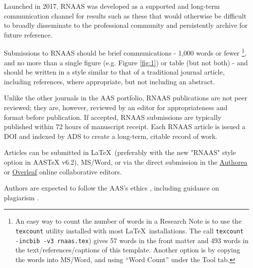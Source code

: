 \documentclass[RNAAS]{aastex62}
\newcommand\latex{La\TeX}
\begin{document}
Launched in 2017, RNAAS was developed as a supported and long-term
communication channel for results such as these that would otherwise be
difficult to broadly disseminate to the professional community and persistently
archive for future reference.

Submissions to RNAAS should be brief communications - 1,000 words or fewer
\footnote{An easy way to count the number of words in a Research Note is to use
the \texttt{texcount} utility installed with most \latex\ installations. The
call  \texttt{texcount -incbib -v3 rnaas.tex}) gives 57 words in the front
matter and 493 words in the text/references/captions of this template. Another
option is by copying the words into MS/Word, and using ``Word Count'' under the
Tool tab.}, and no more than a single figure (e.g. Figure \ref{fig:1}) or table
(but not both) - and should be written in a style similar to that of a
traditional journal article, including references, where appropriate, but not
including an abstract.

Unlike the other journals in the AAS portfolio, RNAAS publications are not
peer reviewed; they are, however, reviewed by an editor for appropriateness
and format before publication. If accepted, RNAAS submissions are typically
published within 72 hours of manuscript receipt. Each RNAAS article is
issued a DOI and indexed by ADS \citep{2000A&AS..143...41K} to create a
long-term, citable record of work.

Articles can be submitted in \latex\ (preferably with the new "RNAAS"
style option in AASTeX v6.2), MS/Word, or via the direct submission in the
\href{http://www.authorea.com}{Authorea} or
\href{http://www.overleaf.com}{Overleaf} online collaborative editors.

Authors are expected to follow the AAS's ethics \citep{2006ApJ...652..847K},
including guidance on plagiarism \citep{2012AAS...21920404V}.
\end{document}
